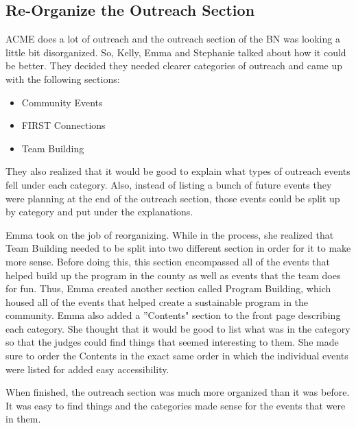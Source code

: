 \documentclass{article}
\begin{document}
\subsection{Re-Organize the Outreach Section}
ACME does a lot of outreach and the outreach section of the BN was looking a little bit disorganized. So, Kelly, Emma and Stephanie talked about how it could be better. They decided they needed clearer categories of outreach and came up with the following sections: 

\begin{itemize}
    \item Community Events
    \item FIRST Connections
    \item Team Building
\end{itemize}

They also realized that it would be good to explain what types of outreach events fell under each category. Also, instead of listing a bunch of future events they were planning at the end of the outreach section, those events could be split up by category and put under the explanations. 

Emma took on the job of reorganizing. While in the process, she realized that Team Building needed to be split into two different section in order for it to make more sense. Before doing this, this section encompassed all of the events that helped build up the program in the county as well as events that the team does for fun. Thus, Emma created another section called Program Building, which housed all of the events that helped create a sustainable program in the community. Emma also added a ''Contents" section to the front page describing each category. She thought that it would be good to list what was in the category so that the judges could find things that seemed interesting to them. She made sure to order the Contents in the exact same order in which the individual events were listed for added easy accessibility. 

When finished, the outreach section was much more organized than it was before. It was easy to find things and the categories made sense for the events that were in them. 
\end{document}
